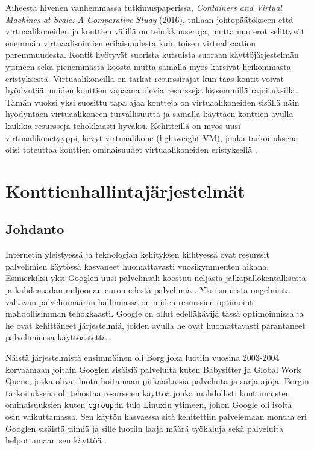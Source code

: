 \documentclass[finnish,gradu]{tktltiki3}
\begin{document}
    Aiheesta hivenen vanhemmassa tutkimuspaperissa, \textit{Containers and Virtual Machines at Scale: A Comparative Study} (2016), tullaan johtopäätökseen että virtuaalikoneiden ja konttien välillä on tehokkuuseroja, mutta nuo erot selittyvät enemmän virtuaalisointien erilaisuudesta kuin toisen virtualisaation paremmuudesta. Kontit hyötyvät suorista kutsuista suoraan käyttöjärjestelmän ytimeen sekä pienemmästä koosta mutta samalla myös kärsivät heikommasta eristyksestä. Virtuaalikoneilla on tarkat resurssirajat kun taas kontit voivat hyödyntää muiden konttien vapaana olevia resursseja löysemmillä rajoituksilla. Tämän vuoksi yksi suosittu tapa ajaa kontteja on virtuaalikoneiden sisällä näin hyödyntäen virtuaalikoneen turvallisuutta ja samalla käyttäen konttien avulla kaikkia resursseja tehokkaasti hyväksi. Kehitteillä on myös uusi virtuaalikonetyyppi, kevyt virtuaalikone (lightweight VM),  jonka tarkoituksena olisi toteuttaa konttien ominaisuudet virtuaalikoneiden eristyksellä \cite{containers-vms-study}.
    
    \section{Konttienhallintajärjestelmät}
    
    \subsection{Johdanto}
    
    Internetin yleistyessä ja teknologian kehityksen kiihtyessä ovat resurssit palvelimien käytössä kasvaneet huomattavasti vuosikymmenten aikana. Esimerkiksi yksi Googlen uusi palvelinsali koostuu neljästä jalkapallokentällisestä ja kahdensadan miljoonan euron edestä palvelimia \cite{borg-goto-youtube}. Yksi suurista ongelmista valtavan palvelinmäärän hallinnassa on niiden resurssien optimointi mahdollisimman tehokkaasti. Google on ollut edelläkävijä tässä optimoinnissa ja he ovat kehittäneet järjestelmiä, joiden avulla he ovat huomattavasti parantaneet palvelimiensa käyttöastetta \cite{borg-omega-kubernetes}.
    
    Näistä järjestelmistä ensimmäinen oli Borg joka luotiin vuosina 2003-2004 korvaamaan joitain Googlen sisäisiä palveluita kuten Babysitter ja Global Work Queue, jotka olivat luotu hoitamaan pitkäaikaisia palveluita ja sarja-ajoja. Borgin tarkoituksena oli tehostaa resurssien käyttöä jonka mahdollisti konttimaisten ominaisuuksien kuten \texttt{cgroup}:in tulo Linuxin ytimeen, johon Google oli isolta osin vaikuttamassa. Sen käytön kasvaessa sitä kehitettiin palvelemaan montaa eri Googlen sisäistä tiimiä ja sille luotiin laaja määrä työkaluja sekä palveluita helpottamaan sen käyttöä
    \cite{borg-omega-kubernetes}.
    
\end{document}
